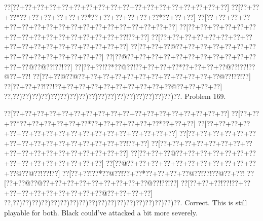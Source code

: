 \documentclass[a5paper]{article}
\begin{document}
\newpage
\begin{center}
{\goo
\0??[\0??+\0??+\0??+\0??+\0??+\0??+\0??+\0??+\0??+\0??+\0??+\0??+\0??+\0??+\0??+\0??+\0??+\0??]
\0??[\0??+\0??+\0??*\0??+\0??+\0??+\0??+\0??+\0??*\0??+\0??+\0??+\0??+\0??+\0??*\0??+\0??+\0??]
\0??[\0??+\0??+\0??+\0??+\0??+\0??+\0??+\0??+\0??+\0??+\0??+\0??+\0??+\0??+\0??+\0??+\0??+\0??]
\0??[\0??+\0??+\0??+\0??+\0??+\0??+\0??+\0??+\0??+\0??+\0??+\0??+\0??+\0??+\0??+\0??!\0??+\0??]
\0??[\0??+\0??+\0??+\0??+\0??+\0??+\0??+\0??+\0??+\0??+\0??+\0??+\0??+\0??+\0??+\0??+\0??+\0??]
\0??[\0??+\0??+\0??@\0??+\0??+\0??+\0??+\0??+\0??+\0??+\0??+\0??+\0??+\0??+\0??+\0??+\0??+\0??]
\0??[\0??@\0??+\0??+\0??+\0??+\0??+\0??+\0??+\0??+\0??+\0??+\0??+\0??+\0??@\0??@\0??!\0??!\0??]
\0??[\0??+\0??!\0??*\0??@\0??!\0??+\0??+\0??+\0??*\0??+\0??+\0??+\0??@\0??!\0??!\0??@\0??+\0??!
\0??[\0??+\0??@\0??@\0??+\0??+\0??+\0??+\0??+\0??+\0??+\0??+\0??+\0??+\0??+\0??@\0??!\0??!\0??]
\0??[\0??+\0??+\0??!\0??!\0??+\0??+\0??+\0??+\0??+\0??+\0??+\0??+\0??+\0??@\0??+\0??+\0??+\0??]
\0??,\0??)\0??)\0??)\0??)\0??)\0??)\0??)\0??)\0??)\0??)\0??)\0??)\0??)\0??)\0??)\0??)\0??)\0??.
}
Problem 169.

\end{center}
\begin{center}
{\goo
\0??[\0??+\0??+\0??+\0??+\0??+\0??+\0??+\0??+\0??+\0??+\0??+\0??+\0??+\0??+\0??+\0??+\0??+\0??]
\0??[\0??+\0??+\0??*\0??+\0??+\0??+\0??+\0??+\0??*\0??+\0??+\0??+\0??+\0??+\0??*\0??+\0??+\0??]
\0??[\0??+\0??+\0??+\0??+\0??+\0??+\0??+\0??+\0??+\0??+\0??+\0??+\0??+\0??+\0??+\0??+\0??+\0??]
\0??[\0??+\0??+\0??+\0??+\0??+\0??+\0??+\0??+\0??+\0??+\0??+\0??+\0??+\0??+\0??+\0??!\0??+\0??]
\0??[\0??+\0??+\0??+\0??+\0??+\0??+\0??+\0??+\0??+\0??+\0??+\0??+\0??+\0??+\0??+\0??+\0??+\0??]
\0??[\0??+\0??+\0??@\0??+\0??+\0??+\0??+\0??+\0??+\0??+\0??+\0??+\0??+\0??+\0??+\0??+\0??+\0??]
\0??[\0??@\0??+\0??+\0??+\0??+\0??+\0??+\0??+\0??+\0??+\0??+\0??+\0??@\0??@\0??!\0??!\0??]
\0??[\0??+\0??!\0??*\0??@\0??!\0??+\0??*\0??+\0??+\0??+\0??@\0??!\0??!\0??@\0??+\0??!
\0??[\0??+\0??@\0??@\0??+\0??+\0??+\0??+\0??+\0??+\0??+\0??+\0??@\0??!\0??!\0??]
\0??[\0??+\0??+\0??!\0??!\0??+\0??+\0??+\0??+\0??+\0??+\0??+\0??+\0??+\0??@\0??+\0??+\0??+\0??]
\0??,\0??)\0??)\0??)\0??)\0??)\0??)\0??)\0??)\0??)\0??)\0??)\0??)\0??)\0??)\0??)\0??)\0??)\0??.
}
Correct. This is still playable for both. Black could've attacked a bit more severely.

\end{center}
\end{document}
